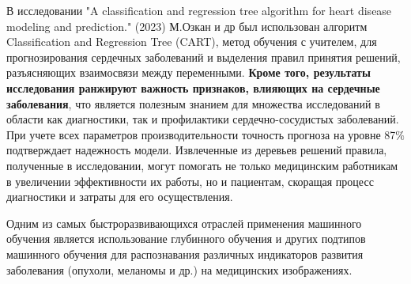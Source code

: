 \documentclass[14pt, a4paper]{extarticle}
\begin{document}
В исследовании "A classification and regression tree
algorithm for heart disease modeling and prediction." (2023)  М.Озкан и др \cite{ozcan2023classification} был использован алгоритм Classification and Regression Tree (CART), метод обучения с учителем, для прогнозирования сердечных заболеваний и выделения правил принятия решений, разъясняющих взаимосвязи между переменными. \textbf{Кроме того, результаты исследования ранжируют важность признаков, влияющих на сердечные заболевания}, что является полезным знанием для множества исследований в области как диагностики, так и профилактики сердечно-сосудистых заболеваний.  При учете всех параметров производительности точность прогноза на уровне 87$\%$ подтверждает надежность модели. Извлеченные из деревьев решений правила, полученные в исследовании, могут помогать не только медицинским работникам в увеличении эффективности их работы, но и пациентам, скоращая процесс диагностики и затраты для его осуществления.

Одним из самых быстроразвивающихся отраслей применения машинного обучения является использование глубинного обучения и других подтипов машинного обучения для распознавания различных индикаторов развития заболевания (опухоли, меланомы и др.) на медицинских изображениях.
\end{document}
